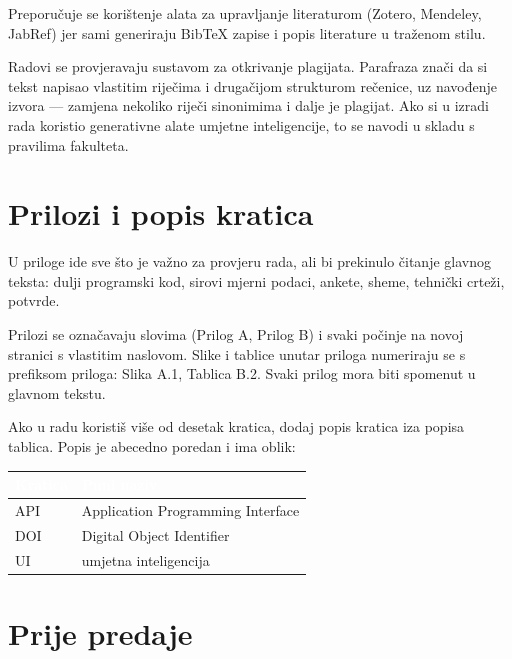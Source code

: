 \documentclass[12pt,a4paper,oneside]{report}
\newcommand{\zaglavlje}[1]{\textbf{\textcolor{white}{#1}}}
\begin{document}
Preporučuje se korištenje alata za upravljanje literaturom (Zotero, Mendeley, JabRef) jer sami generiraju BibTeX zapise i popis literature u traženom stilu.

Radovi se provjeravaju sustavom za otkrivanje plagijata. Parafraza znači da si tekst napisao vlastitim riječima i drugačijom strukturom rečenice, uz navođenje izvora — zamjena nekoliko riječi sinonimima i dalje je plagijat. Ako si u izradi rada koristio generativne alate umjetne inteligencije, to se navodi u skladu s pravilima fakulteta.

\chapter{Prilozi i popis kratica}

U priloge ide sve što je važno za provjeru rada, ali bi prekinulo čitanje glavnog teksta: dulji programski kod, sirovi mjerni podaci, ankete, sheme, tehnički crteži, potvrde.

Prilozi se označavaju slovima (Prilog A, Prilog B) i svaki počinje na novoj stranici s vlastitim naslovom. Slike i tablice unutar priloga numeriraju se s prefiksom priloga: Slika A.1, Tablica B.2. Svaki prilog mora biti spomenut u glavnom tekstu.

Ako u radu koristiš više od desetak kratica, dodaj popis kratica iza popisa tablica. Popis je abecedno poredan i ima oblik:

\begin{table}[H]
  \centering
  \small
  \begin{tabular}{L{2.6cm} L{10cm}}
    \toprule
    \zaglavlje{Kratica} & \zaglavlje{Puni naziv} \\
    \midrule
    API & Application Programming Interface \\
    DOI & Digital Object Identifier \\
    UI  & umjetna inteligencija \\
    \bottomrule
  \end{tabular}
\end{table}

\chapter{Prije predaje}
\label{pog:predaja}
\end{document}
